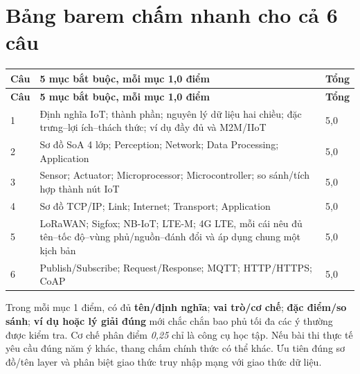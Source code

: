 \documentclass[11pt,a4paper]{article}
\begin{document}
\section{Bảng barem chấm nhanh cho cả 6 câu}
\small\begin{longtable}{@{}p{17mm}p{119mm}p{15mm}@{}}\toprule\textbf{Câu} & \textbf{5 mục bắt buộc, mỗi mục 1,0 điểm} & \textbf{Tổng}\\\midrule\endfirsthead\toprule\textbf{Câu} & \textbf{5 mục bắt buộc, mỗi mục 1,0 điểm} & \textbf{Tổng}\\\midrule\endhead
1 & Định nghĩa IoT; thành phần; nguyên lý dữ liệu hai chiều; đặc trưng--lợi ích--thách thức; ví dụ đầy đủ và M2M/IIoT & 5,0\\
2 & Sơ đồ SoA 4 lớp; Perception; Network; Data Processing; Application & 5,0\\
3 & Sensor; Actuator; Microprocessor; Microcontroller; so sánh/tích hợp thành nút IoT & 5,0\\
4 & Sơ đồ TCP/IP; Link; Internet; Transport; Application & 5,0\\
5 & LoRaWAN; Sigfox; NB-IoT; LTE-M; 4G LTE, mỗi cái nêu đủ tên--tốc độ--vùng phủ/nguồn--đánh đổi và áp dụng chung một kịch bản & 5,0\\
6 & Publish/Subscribe; Request/Response; MQTT; HTTP/HTTPS; CoAP & 5,0\\\bottomrule
\end{longtable}\normalsize
\begin{notesbox}[title={Tự chấm theo độ sâu, không chấm theo độ dài}]
Trong mỗi mục 1 điểm, có đủ \textbf{tên/định nghĩa}; \textbf{vai trò/cơ chế}; \textbf{đặc điểm/so sánh}; \textbf{ví dụ hoặc lý giải đúng} mới chắc chắn bao phủ tối đa các ý thường được kiểm tra. Cơ chế phân điểm \emph{0,25} chỉ là công cụ học tập. Nếu bài thi thực tế yêu cầu đúng năm ý khác, thang chấm chính thức có thể khác. Ưu tiên đúng sơ đồ/tên layer và phân biệt giao thức truy nhập mạng với giao thức dữ liệu.
\end{notesbox}
\end{document}
